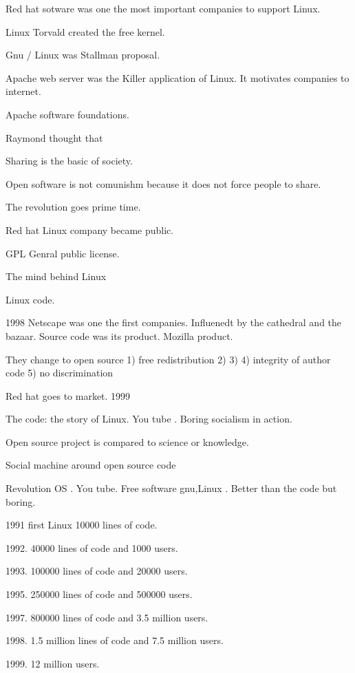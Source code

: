   Red hat sotware was one the most important companies to support Linux. 
  
  Linux Torvald created the free kernel. 
  
  
  
  Gnu / Linux was Stallman proposal. 
  
  Apache web server was the Killer application of Linux. It motivates companies to internet. 
  
  Apache software foundations. 
  
  Raymond thought that 
  
  
  Sharing is the basic of society. 
  
  Open software is not comunishm because it does not force people to share. 
  
  The revolution goes prime time. 
  
  Red hat Linux company became public. 
  
  
  GPL Genral public license. 
  
  
  The mind behind Linux 
  
  Linux code. 
  
  
  1998 Netscape was one the first companies.
  Influenedt by the cathedral and the bazaar. 
  Source code was its product. Mozilla product. 
  
  They change to open source 
  1) free redistribution 
  2) 
  3) 
  4) integrity of author code 
  5) no discrimination  
  
  
  Red hat goes to market. 1999
  
  The code: the story of Linux. You tube . Boring  socialism in action. 
  
  Open source project is compared to science or knowledge. 
  
  
  Social machine around open source code 
  
  Revolution OS . You tube. Free software gnu,Linux . Better than the code but boring. 
  
  1991 first Linux 10000 lines of code. 
  
  1992. 40000 lines of code and 1000 users. 
  
  1993. 100000 lines of code and 20000 users. 
  
  1995. 250000 lines of code and 500000 users.
  
  1997. 800000 lines of code and 3.5 million users.  
  
  1998. 1.5 million lines of code and 7.5 million users. 
  
  1999. 12 million users. 
  
